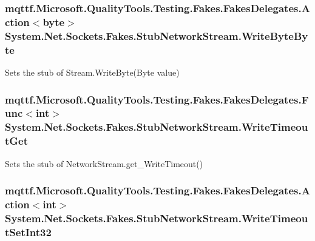 \hypertarget{class_system_1_1_net_1_1_sockets_1_1_fakes_1_1_stub_network_stream_ab37905d132639f69fd402439ec17b43f}{
\subsubsection[{Write\-Byte\-Byte}]{\setlength{\rightskip}{0pt plus 5cm}mqttf.\-Microsoft.\-Quality\-Tools.\-Testing.\-Fakes.\-Fakes\-Delegates.\-Action$<$byte$>$ System.\-Net.\-Sockets.\-Fakes.\-Stub\-Network\-Stream.\-Write\-Byte\-Byte}}\label{class_system_1_1_net_1_1_sockets_1_1_fakes_1_1_stub_network_stream_ab37905d132639f69fd402439ec17b43f}


Sets the stub of Stream.\-Write\-Byte(\-Byte value)

\hypertarget{class_system_1_1_net_1_1_sockets_1_1_fakes_1_1_stub_network_stream_abf2f65229a61e30f655906fea2446e40}{
\subsubsection[{Write\-Timeout\-Get}]{\setlength{\rightskip}{0pt plus 5cm}mqttf.\-Microsoft.\-Quality\-Tools.\-Testing.\-Fakes.\-Fakes\-Delegates.\-Func$<$int$>$ System.\-Net.\-Sockets.\-Fakes.\-Stub\-Network\-Stream.\-Write\-Timeout\-Get}}\label{class_system_1_1_net_1_1_sockets_1_1_fakes_1_1_stub_network_stream_abf2f65229a61e30f655906fea2446e40}


Sets the stub of Network\-Stream.\-get\-\_\-\-Write\-Timeout()

\hypertarget{class_system_1_1_net_1_1_sockets_1_1_fakes_1_1_stub_network_stream_ac7d52d17cbe535ef5d30dd0d94f32341}{
\subsubsection[{Write\-Timeout\-Set\-Int32}]{\setlength{\rightskip}{0pt plus 5cm}mqttf.\-Microsoft.\-Quality\-Tools.\-Testing.\-Fakes.\-Fakes\-Delegates.\-Action$<$int$>$ System.\-Net.\-Sockets.\-Fakes.\-Stub\-Network\-Stream.\-Write\-Timeout\-Set\-Int32}}\label{class_system_1_1_net_1_1_sockets_1_1_fakes_1_1_stub_network_stream_ac7d52d17cbe535ef5d30dd0d94f32341}


